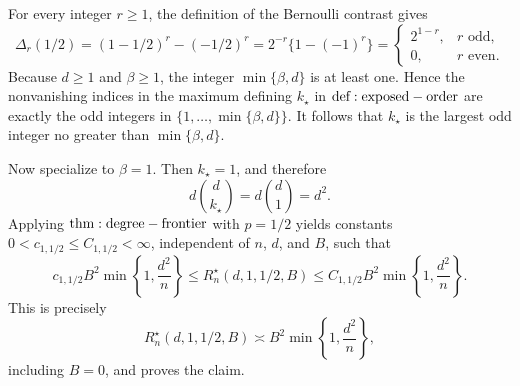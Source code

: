 For every integer \(r\ge 1\), the definition of the Bernoulli contrast gives
\[
\Delta_r(1/2)=(1-1/2)^r-(-1/2)^r
=2^{-r}\{1-(-1)^r\}
=\begin{cases}
2^{1-r},&r\text{ odd},\\
0,&r\text{ even}.
\end{cases}
\]
Because \(d\ge1\) and \(\beta\ge1\), the integer \(\min\{\beta,d\}\) is at least one. Hence the nonvanishing indices in the maximum defining \(k_\star\) in \({\rm def:exposed-order}\) are exactly the odd integers in \(\{1,\ldots,\min\{\beta,d\}\}\). It follows that \(k_\star\) is the largest odd integer no greater than \(\min\{\beta,d\}\).

Now specialize to \(\beta=1\). Then \(k_\star=1\), and therefore
\[
d\binom{d}{k_\star}=d\binom d1=d^2.
\]
Applying \({\rm thm:degree-frontier}\) with \(p=1/2\) yields constants \(0<c_{1,1/2}\le C_{1,1/2}<\infty\), independent of \(n\), \(d\), and \(B\), such that
\[
c_{1,1/2}B^2\min\!\left\{1,\frac{d^2}{n}\right\}
\le R_n^\star(d,1,1/2,B)
\le C_{1,1/2}B^2\min\!\left\{1,\frac{d^2}{n}\right\}.
\]
This is precisely
\[
R_n^\star(d,1,1/2,B)\asymp B^2\min\!\left\{1,\frac{d^2}{n}\right\},
\]
including \(B=0\), and proves the claim.